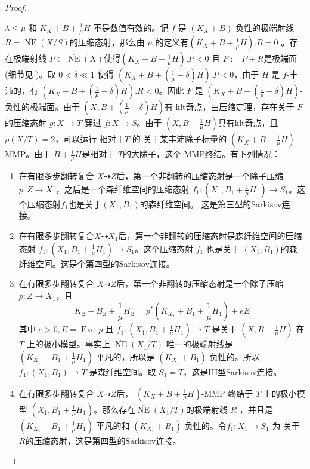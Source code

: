 \begin{proof}
  \begin{enumerate}
     $\lambda\leqslant \mu$ 和  $ K_X+B+\frac{1}{\mu}H $ 不是数值有效的。记 $ f $ 是 $ (K_X+B) $-负性的极端射线$ R= \overline{\operatorname{ NE }}(X/S) $的压缩态射，那么由 $\mu$ 的定义有$ (K_X+B+\frac{1}{\mu}H).R=0 $ 。存在极端射线 $ P \subset \overline{\operatorname{ NE }}(X) $使得$ (K_X+B+\frac{1}{\mu}H).P<0 $ 且 $ F:=P+R $是极端面  (细节见 \citet [5.4.2]{cortiFactoringBirationalMaps} )。取  $ 0<\delta\ll 1 $ 使得 $ (K_X+B+(\frac{1}{\mu}-\delta)H).P<0 $，由于  $H$ 是 $f$-丰沛的，有 $  (K_X+B+(\frac{1}{\mu}-\delta)H).R<0 $。因此 $ F $ 是 $  (K_X+B+(\frac{1}{\mu}-\delta)H) $-负性的极端面。由于 $ (X,B+(\frac{1}{\mu}-\delta)H) $有 klt奇点，由压缩定理，存在关于 $F$ 的压缩态射 $ g:X\to T $  穿过 $ f:X\to S $。由于  $ (X,B+\frac{1}{\mu}H) $具有klt奇点，且 $ \rho(X/T)=2 $，可以运行 相对于$T$ 的 关于某丰沛除子标量的 $ (K_X+B+\frac{1}{\mu}H) $-MMP。由于 $ B+\frac{1}{\mu}H $是相对于 $T$的大除子，这个 MMP终结。有下列情况：
    \begin{enumerate}
      \item 在有限多步翻转复合 $ X\dashrightarrow Z $后，第一个非翻转的压缩态射是一个除子压缩 $ p:Z\to X_1 $，之后是一个森纤维空间的压缩态射 $f_{1}:(X_{1},B_{1}+\frac{1}{\mu}H_{1})\to S_1$。这个压缩态射$f_1$也是关于$(X_{1},B_{1})$的森纤维空间。
      这是第三型的Sarkisov连接。
      \item 在有限多步翻转复合$ X\dashrightarrow X_1 $后，第一个非翻转的压缩态射是森纤维空间的压缩态射 $ f_1:(X_1,B_1+\frac{1}{\mu}H_1)\to S_{1} $。这个压缩态射 $f_1$ 也是关于 $(X_{1},B_{1})$的森纤维空间。这是个第四型的Sarkisov连接。
      \item 在有限多步翻转复合 $ X\dashrightarrow Z $后，第一个非翻转的压缩态射是一个除子压缩 $ p:Z\to X_1 $，且
            \[ K_Z+B_Z+\frac{1}{\mu}H_Z=p^*(K_{X_1}+B_1+\frac{1}{\mu}H_1)+eE \]
            其中 $ e>0 ,E=\operatorname{Exc}\,p$ 且  $f_{1}: (X_1,B_1+\frac{1}{\mu}H_1) \to T$ 是关于 $(X,B+\frac{1}{\mu}H)$ 在 $T$ 上的极小模型。事实上  $ \overline{\operatorname{NE}}(X_1/T) $ 唯一的极端射线是$ (K_{X_1}+B_1+\frac{1}{\mu}H_1) $-平凡的，所以是 $ (K_{X_1}+B_1) $-负性的。所以 $ f_1:(X_1, B_1)\to T $ 是森纤维空间。取 $ S_1=T $，这是III型Sarkisov连接。
      \item 在有限多步翻转复合 $ X\dashrightarrow Z $后，  $(K_{X}+B+\frac{1}{\mu}H)$-MMP 终结于 $T$ 上的极小模型 $ (X_1,B_1+\frac{1}{\mu}H_1) $。那么存在$ \overline{\operatorname{NE}}(X_1/T) $的极端射线 $R$ ，并且是 $ (K_{X_1}+B_1+\frac{1}{\mu}H_1) $-平凡的和 $ (K_{X_1}+B_1) $-负性的。令$ f_1:X_1\to S_1 $ 为 关于$R$的压缩态射，这是第四型的Sarkisov连接。

\end{enumerate}
\end{enumerate}
\end{proof}
